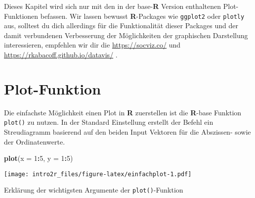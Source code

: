 \documentclass[
]{book}
\newenvironment{Shaded}{\begin{snugshade}}{\end{snugshade}}
\newcommand{\DataTypeTok}[1]{\textcolor[rgb]{0.13,0.29,0.53}{#1}}
\newcommand{\DecValTok}[1]{\textcolor[rgb]{0.00,0.00,0.81}{#1}}
\newcommand{\KeywordTok}[1]{\textcolor[rgb]{0.13,0.29,0.53}{\textbf{#1}}}
\newcommand{\NormalTok}[1]{#1}
\newcommand{\OperatorTok}[1]{\textcolor[rgb]{0.81,0.36,0.00}{\textbf{#1}}}
\begin{document}
Dieses Kapitel wird sich nur mit den in der base-\textbf{R} Version enthaltenen Plot-Funktionen befassen.
Wir lassen bewusst \textbf{R}-Packages wie \texttt{ggplot2} oder \texttt{plotly} aus, solltest du dich allerdings für die Funktionalität dieser Packages und der damit verbundenen Verbesserung der Möglichkeiten der graphischen Darstellung interessieren, empfehlen wir dir die \url{https://socviz.co/} und \url{https://rkabacoff.github.io/datavis/} .

\hypertarget{plot-funktion}{%
\section{Plot-Funktion}\label{plot-funktion}}

Die einfachste Möglichkeit einen Plot in \textbf{R} zuerstellen ist die \textbf{R}-base Funktion \texttt{plot()} zu nutzen. In der Standard Einstellung erstellt der Befehl ein Streudiagramm basierend auf den beiden Input Vektoren für die Abszissen- sowie der Ordinatenwerte.

\begin{Shaded}
\begin{Highlighting}[]
\KeywordTok{plot}\NormalTok{(}\DataTypeTok{x =} \DecValTok{1}\OperatorTok{:}\DecValTok{5}\NormalTok{,}
     \DataTypeTok{y =} \DecValTok{1}\OperatorTok{:}\DecValTok{5}\NormalTok{)}
\end{Highlighting}
\end{Shaded}

\texttt{[image: intro2r\_files/figure-latex/einfachplot-1.pdf]}

Erklärung der wichtigsten Argumente der \texttt{plot()}-Funktion
\end{document}
